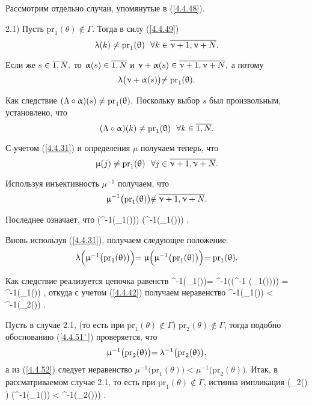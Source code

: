 Рассмотрим отдельно случаи, упомянутые в (\ref{4.4.48}).

2.1) Пусть $\mathrm{pr}_1(\theta) \notin \Gamma.$
Тогда в силу (\ref{4.4.49})
$$
  \la(k) \neq \mathrm{pr}_1(\theta)\ \ \fa k\in \ov{\nu+1,\nu+ N}
  .
$$

Если же $s\in \ov{1,N},$
то $\al(s) \in \ov{1,N}$
и $\nu +\al(s) \in \ov{\nu +1,\nu+N},$
а потому
$$
  \uplambda\bigl(\upnu +\upalpha(s)\bigl) \neq \mathrm{pr}_1(\uptheta)
  .
$$

Как следствие
$(\Lambda\circ \upalpha)(s) \neq \mathrm{pr}_1(\uptheta).$
Поскольку выбор $s$ был
произвольным, установлено, что
$$
  (\La \circ \al)(k) \neq \mathrm{pr}_1(\theta)\ \ \fa k\in \ov{1,N}
  .
$$

С учетом (\ref{4.4.31})
и определения $\mu$ получаем теперь, что
$$
  \mu(j) \neq \mathrm{pr}_1(\theta)\ \ \fa j\in \ov{\nu+1,\nu+N}
  .
$$

Используя инъективность $\mu^{-1}$ получаем, что
$$
  \mu^{-1}\bigl(\mathrm{pr}_1(\theta)\bigl)\notin \ov{\nu+1,\nu+N}
  .
$$

Последнее означает, что
\bfn
  \label{4.4.51}
  \Bigl(\mu^{-1}\bigl(_1(\theta)\bigl)\in {}\Bigl)  \vee
  \Bigl(\mu^{-1}\bigl(_1(\theta)\bigl)\in {}\Bigl)
  .
\efn

Вновь используя (\ref{4.4.31}),
получаем следующее положение:
$$
  \uplambda\Bigl(\upmu^{-1}\bigl(\mathrm{pr}_1(\uptheta)\bigl)\Bigl) = \upmu\Bigl(\upmu^{-1}\bigl(\mathrm{pr}_1(\uptheta)\bigl)\Bigl)= \mathrm{pr}_1(\uptheta)
  .
$$

Как следствие реализуется цепочка равенств
\bfn
  \label{4.4.51`}
  \mu^{-1}\bigl(_1(\theta)\bigl)= \la^{-1}\biggl(\la\Bigl(\mu^{-1}
  \bigl(_1(\theta)\bigl)\Bigl)\biggl) =
  \la^{-1}\bigl(_1(\theta)\bigl)
  ,
\efn
откуда с учетом (\ref{4.4.42})
получаем неравенство
\bfn
  \label{4.4.52}
  \mu^{-1}\bigl(_1(\theta)\bigl) < \la^{-1}\bigl(_2(\theta)\bigl)
  .
\efn

Пусть в случае 2.1,
(то есть при $\mathrm{pr}_1(\theta) \notin \Gamma$)
$\mathrm{pr}_2(\theta) \notin \Gamma$,
тогда подобно обоснованию (\ref{4.4.51`}) проверяется, что
$$
  \upmu^{-1}\bigl(\mathrm{pr}_2(\uptheta)\bigl) = \uplambda^{-1}\bigl(\mathrm{pr}_2(\uptheta)\bigl)
  ,
$$
а из (\ref{4.4.52})
следует неравенство
$\mu^{-1}\bigl(\mathrm{pr}_1(\theta)\bigl) <
\mu^{-1}\bigl(\mathrm{pr}_2(\theta)\bigl).$
Итак, в рассматриваемом случае 2.1,
то есть при
$\mathrm{pr}_1(\theta) \notin \Gamma$,
истинна импликация
\bfn
  \label{4.4.53}
  \bigl(_2(\theta) \notin \Gamma) \Longrightarrow
  \Bigl(\mu^{-1}\bigl(_1(\theta)\bigl) <
  \mu^{-1}\bigl(_2(\theta)\bigl)\Bigl)
  .
\efn

